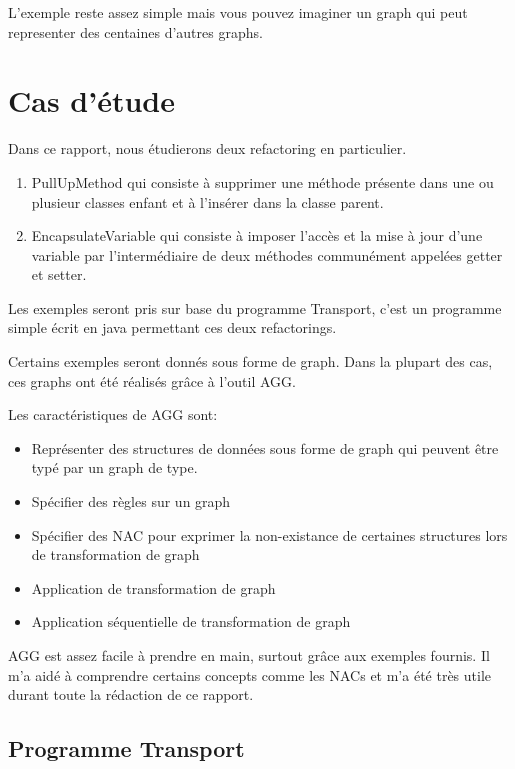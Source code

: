\documentclass[a4paper, 12pt]{article}
\begin{document}
  L'exemple reste assez simple mais vous pouvez imaginer un graph qui peut representer des centaines d'autres graphs.

  \section{Cas d'étude}

  Dans ce rapport, nous étudierons deux refactoring en particulier.

  \begin{enumerate}
    \item PullUpMethod qui consiste à supprimer une méthode présente dans une ou plusieur classes enfant et à l'insérer dans la classe parent.
    \item EncapsulateVariable qui consiste à imposer l'accès et la mise à jour d'une variable par l'intermédiaire de deux méthodes communément appelées getter et setter.
  \end{enumerate}

  Les exemples seront pris sur base du programme Transport, c'est un programme simple écrit en java permettant ces deux refactorings.

  Certains exemples seront donnés sous forme de graph. Dans la plupart des cas, ces graphs ont été réalisés grâce à l'outil AGG.

  Les caractéristiques de AGG sont:

  \begin{itemize}[label=\textbullet]
    \item Représenter des structures de données sous forme de graph qui peuvent être typé par un graph de type.
    \item Spécifier des règles sur un graph
    \item Spécifier des NAC pour exprimer la non-existance de certaines structures lors de transformation de graph
    \item Application de transformation de graph
    \item Application séquentielle de transformation de graph
  \end{itemize}

  AGG est assez facile à prendre en main, surtout grâce aux exemples fournis. Il m'a aidé à comprendre certains concepts comme les NACs et m'a été très utile durant toute la rédaction de ce rapport.

  \subsection{Programme Transport}
\end{document}
